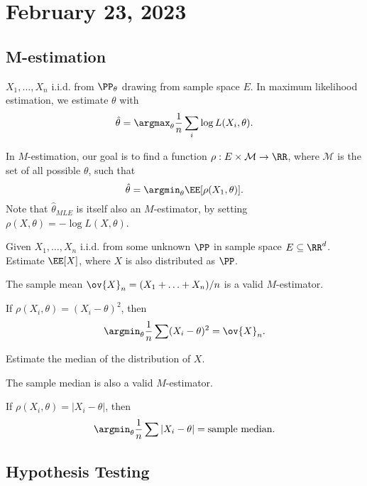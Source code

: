 \section{February 23, 2023}

\subsection{M-estimation}

$X_1, \hdots, X_n$ i.i.d. from $\PP_{\theta}$ drawing from sample space $E$. In maximum likelihood estimation, we estimate $\theta$ with
\[\hat{\theta} = \argmax_{\theta} \frac{1}{n}\sum_i \log L(X_i, \theta).\]

In $M$-estimation, our goal is to find a function $\rho: E\times \mathcal{M}\rightarrow \RR$, where $\mathcal{M}$ is the set of all possible $\theta$, such that 
\[\hat{\theta} = \argmin_{\theta}\EE[\rho(X_1, \theta)].\]
Note that $\hat{\theta}_{MLE}$ is itself also an $M$-estimator, by setting $\rho(X, \theta) = -\log L(X,\theta)$. 

\begin{example}
\exlabel

Given $X_1, \hdots, X_n$ i.i.d. from some unknown $\PP$ in sample space $E\subseteq \RR^d$. Estimate $\EE[X]$, where $X$ is also distributed as $\PP$. 
\end{example}

The sample mean $\ov{X}_n = (X_1 + \hdots + X_n)/n$ is a valid $M$-estimator.

\begin{theorem}
\claimlabel

If $\rho(X_i, \theta) = (X_i-\theta)^2$, then 
\[\argmin_{\theta} \frac{1}{n}\sum (X_i-\theta)^2 = \ov{X}_n.\]
\end{theorem}

\begin{example}
\exlabel

Estimate the median of the distribution of $X$.
\end{example}

The sample median is also a valid $M$-estimator.

\begin{theorem}
\claimlabel

If $\rho(X_i, \theta) = \vert X_i-\theta\vert$, then 
\[\argmin_{\theta} \frac{1}{n}\sum \vert X_i-\theta\vert = \text{sample median}.\]
\end{theorem}

\subsection{Hypothesis Testing}

